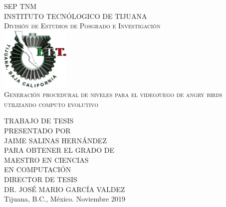 \begin{titlepage}
  \begin{center}
  \textsc{\Large SEP}
  \:\:\:\:\:\:\:\:\:\:\:\:\:\:\:\:\:\:\:\:\:\:\:\:\:\:\:\:\:\:\:\:\:\:\:\:
\:\:\:\:\:\:\:\:\:\:\:\:\:\:\:\:\:\:\:\:\:\:\:\:\:\:\:\:\:\:\:\:\:\:\:\:
\:\:\:\:\:\:\:\:\:\:\:\:\:\:\:\:
  \textsc{\Large TNM}~\\[1cm]
  \textsc{\Large INSTITUTO TECNÓLOGICO DE TIJUANA}~\\[1cm]
  \textsc{\Large División de Estudios de Posgrado e
    Investigación}~\\[0.5cm]

    \includegraphics[width=0.25\textwidth]{./logos.png}~\\[1cm]

    
    \textsc{\LARGE Generación procedural de niveles para el videojuego de angry birds utilizando computo evolutivo}~\\[1.5cm]




\begin{minipage}{1\textwidth}
  \begin{flushright} \large
    TRABAJO DE TESIS~\\[0.5cm]
    \small
    PRESENTADO POR~\\[0.5cm]
    \large
    JAIME SALINAS HERNÁNDEZ ~\\[0.5cm]
    \small
    PARA OBTENER EL GRADO DE~\\[0.5cm]
    \large
    MAESTRO EN CIENCIAS~\\
    EN COMPUTACIÓN~\\[0.5cm]
    \small
    DIRECTOR DE TESIS~\\
    \large
    DR. JOSÉ MARIO GARCÍA VALDEZ~\\[0.5cm]
    \small
    Tijuana, B.C., México. Noviembre 2019
  \end{flushright}
\end{minipage}


\end{center}
\end{titlepage}
